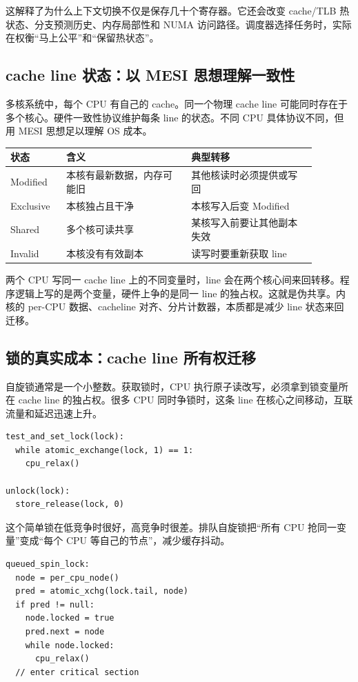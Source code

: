 这解释了为什么上下文切换不仅是保存几十个寄存器。它还会改变 cache/TLB 热状态、分支预测历史、内存局部性和 NUMA 访问路径。调度器选择任务时，实际在权衡“马上公平”和“保留热状态”。

\subsection{cache line 状态：以 MESI 思想理解一致性}

多核系统中，每个 CPU 有自己的 cache。同一个物理 cache line 可能同时存在于多个核心。硬件一致性协议维护每条 line 的状态。不同 CPU 具体协议不同，但用 MESI 思想足以理解 OS 成本。

\begin{longtable}{p{0.16\linewidth}p{0.36\linewidth}p{0.36\linewidth}}
\toprule
状态 & 含义 & 典型转移 \\
\midrule
Modified & 本核有最新数据，内存可能旧 & 其他核读时必须提供或写回 \\
Exclusive & 本核独占且干净 & 本核写入后变 Modified \\
Shared & 多个核可读共享 & 某核写入前要让其他副本失效 \\
Invalid & 本核没有有效副本 & 读写时要重新获取 line \\
\bottomrule
\end{longtable}

两个 CPU 写同一 cache line 上的不同变量时，line 会在两个核心间来回转移。程序逻辑上写的是两个变量，硬件上争的是同一 line 的独占权。这就是伪共享。内核的 per-CPU 数据、cacheline 对齐、分片计数器，本质都是减少 line 状态来回迁移。

\subsection{锁的真实成本：cache line 所有权迁移}

自旋锁通常是一个小整数。获取锁时，CPU 执行原子读改写，必须拿到锁变量所在 cache line 的独占权。很多 CPU 同时争锁时，这条 line 在核心之间移动，互联流量和延迟迅速上升。

\begin{lstlisting}
test_and_set_lock(lock):
  while atomic_exchange(lock, 1) == 1:
    cpu_relax()

unlock(lock):
  store_release(lock, 0)
\end{lstlisting}

这个简单锁在低竞争时很好，高竞争时很差。排队自旋锁把“所有 CPU 抢同一变量”变成“每个 CPU 等自己的节点”，减少缓存抖动。

\begin{lstlisting}
queued_spin_lock:
  node = per_cpu_node()
  pred = atomic_xchg(lock.tail, node)
  if pred != null:
    node.locked = true
    pred.next = node
    while node.locked:
      cpu_relax()
  // enter critical section
\end{lstlisting}

